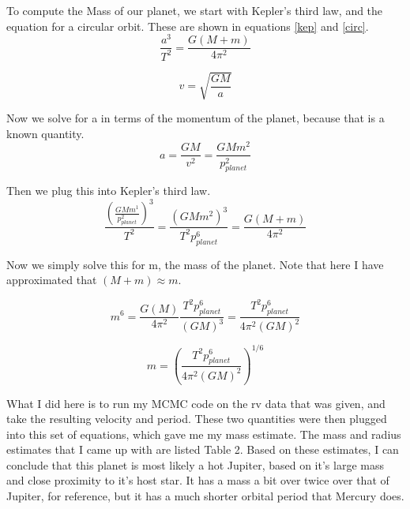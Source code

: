 \documentclass{article}
\begin{document}
To compute the Mass of our planet, we start with Kepler's third law, and the equation for a circular orbit. These are shown in equations \ref{kep} and \ref{circ}.\\

\begin{equation}\label{kep}
\frac{a^3}{T^2} = \frac{G(M + m)}{4 \pi^2}
\end{equation}

\begin{equation}\label{circ}
v = \sqrt{\frac{GM}{a}}
\end{equation}

Now we solve for a in terms of the momentum of the planet, because that is a known quantity.\\

\begin{equation}
a = \frac{GM}{v^2} = \frac{GMm^2}{p_{planet}^2}
\end{equation}

Then we plug this into Kepler's third law.\\

\begin{equation}
\frac{(\frac{GMm^1}{p_{planet}^2})^3}{T^2} =  \frac{(GMm^2)^3}{T^2p_{planet}^6} = \frac{G(M + m)}{4 \pi^2}
\end{equation}

Now we simply solve this for m, the mass of the planet. Note that here I have approximated that $(M + m) \approx m$.

\begin{equation}
m^6 =  \frac{G(M)}{4 \pi^2}   \frac{T^2p_{planet}^6}{(GM)^3} =   \frac{T^2p_{planet}^6}{4 \pi^2(GM)^2}
\end{equation}


\begin{equation}
m =  (\frac{T^2p_{planet}^6}{4 \pi^2(GM)^2})^{1/6}
\end{equation}

What I did here is to run my MCMC code on the rv data that was given, and take the resulting velocity and period. These two quantities were then plugged into this set of equations, which gave me my mass estimate. The mass and radius estimates that I came up with are listed Table 2. Based on these estimates, I can conclude that this planet is most likely a hot Jupiter, based on it's large mass and close proximity to it's host star. It has a mass a bit over twice over that of Jupiter, for reference, but it has a much shorter orbital period that Mercury does.\\
\end{document}
